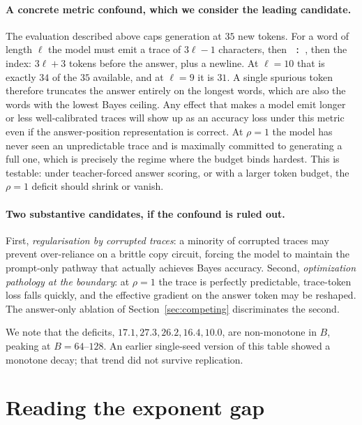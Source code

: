 \documentclass{article}
\theoremstyle{plain}
\theoremstyle{definition}
\theoremstyle{remark}
\newcommand{\1}{\mathbf{1}}
\begin{document}
\paragraph{A concrete metric confound, which we consider the leading candidate.}
The evaluation described above caps generation at $35$ new tokens. For a word of
length $\ell$ the model must emit a trace of $3\ell-1$ characters, then
\texttt{ : }, then the index: $3\ell+3$ tokens before the answer, plus a newline.
At $\ell = 10$ that is exactly $34$ of the $35$ available, and at $\ell = 9$ it
is $31$. A single spurious token therefore truncates the answer entirely on the
longest words, which are also the words with the lowest Bayes ceiling. Any effect
that makes a model emit longer or less well-calibrated traces will show up as an
accuracy loss under this metric even if the answer-position representation is
correct. At $\rho = 1$ the model has never seen an unpredictable trace and is
maximally committed to generating a full one, which is precisely the regime where
the budget binds hardest. This is testable: under teacher-forced answer scoring,
or with a larger token budget, the $\rho = 1$ deficit should shrink or vanish.

\paragraph{Two substantive candidates, if the confound is ruled out.}
First, \emph{regularisation by corrupted traces}: a minority of corrupted traces
may prevent over-reliance on a brittle copy circuit, forcing the model to
maintain the prompt-only pathway that actually achieves Bayes accuracy. Second,
\emph{optimization pathology at the boundary}: at $\rho = 1$ the trace is
perfectly predictable, trace-token loss falls quickly, and the effective gradient
on the answer token may be reshaped. The answer-only ablation of
Section~\ref{sec:competing} discriminates the second.

We note that the deficits, $17.1, 27.3, 26.2, 16.4, 10.0$, are non-monotone in
$B$, peaking at $B = 64$--$128$. An earlier single-seed version of this table
showed a monotone decay; that trend did not survive replication.

\section{Reading the exponent gap}
\label{sec:gap}
\end{document}
